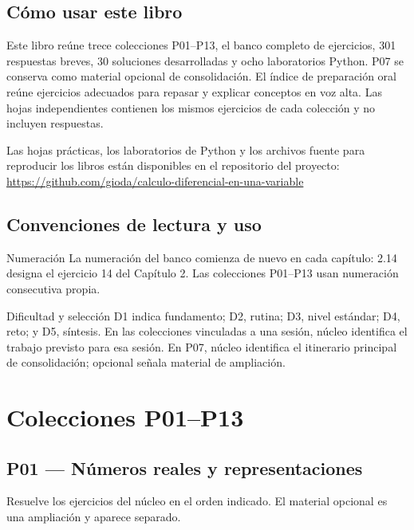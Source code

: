 \documentclass[10pt,a4paper,oneside,openany]{book}
\begin{document}
\frontmatter
\tableofcontents
\chapter*{Cómo usar este libro}
Este libro reúne trece colecciones P01--P13, el banco completo de
ejercicios, 301 respuestas breves, 30 soluciones desarrolladas y ocho
laboratorios Python. P07 se conserva como material opcional de consolidación.
El índice de preparación oral reúne ejercicios adecuados para repasar y
explicar conceptos en voz alta. Las hojas independientes contienen los mismos
ejercicios de cada colección y no incluyen respuestas.

\PublicTheoryCompanionReference

Las hojas prácticas, los laboratorios de Python y los archivos fuente para
reproducir los libros están disponibles en el repositorio del proyecto:
\url{https://github.com/gioda/calculo-diferencial-en-una-variable}
\chapter*{Convenciones de lectura y uso}
\begin{PSevenNotice}{Numeración}
La numeración del banco comienza de nuevo en cada capítulo: 2.14 designa el ejercicio 14 del Capítulo 2. Las colecciones P01--P13 usan numeración consecutiva propia.\end{PSevenNotice}
\begin{PSevenNotice}{Dificultad y selección}
D1 indica fundamento; D2, rutina; D3, nivel estándar; D4, reto; y D5,
síntesis. En las colecciones vinculadas a una sesión, núcleo identifica el
trabajo previsto para esa sesión. En P07, núcleo identifica el itinerario
principal de consolidación; opcional señala material de ampliación.
\end{PSevenNotice}

\mainmatter
\part{Colecciones P01--P13}
\chapter{P01 — Números reales y representaciones}
Resuelve los ejercicios del núcleo en el orden indicado. El material opcional es una ampliación y aparece separado.
\end{document}
